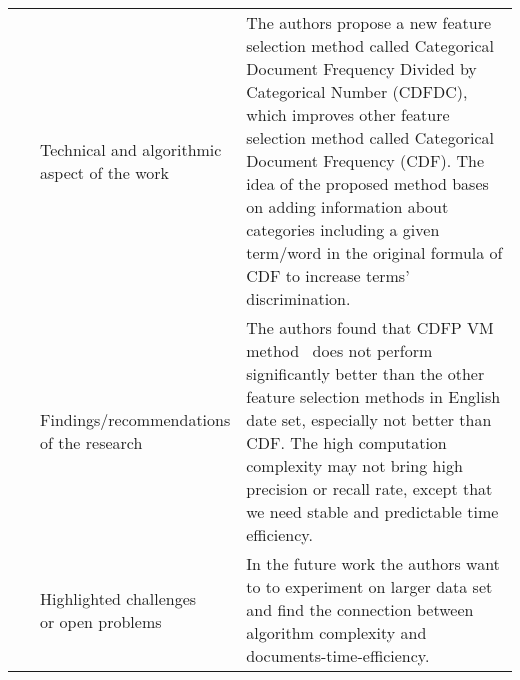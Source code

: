 \begin{landscape}
\begin{longtable}{lp{}p{}}
	\multirow{3}[0]{*}{~\citep{Wang2016}} & 
    \specialcell{Technical and algorithmic \\ aspect of the work} &
	The authors propose a new feature selection method called Categorical Document Frequency Divided by Categorical Number (CDFDC), which improves other feature selection method called Categorical Document Frequency (CDF). The idea of the proposed method bases on adding information about categories including a given term/word in the original formula of CDF to increase terms' discrimination.    
    \\ & 
    \specialcell{Findings/recommendations \\ of the research} & 
	The authors found that CDFP VM method~\citep{Li2014a} does not perform significantly better than the other feature selection methods in English date set, especially not better than CDF. The high computation complexity may not bring high precision or recall rate, except that we need stable and predictable time efficiency.
    \\ & 
    \specialcell{Highlighted challenges \\ or open problems} & 
    In the future work the authors want to  to experiment on larger data set and find the connection between algorithm complexity and documents-time-efficiency.
	\\
	

\end{longtable}
\end{landscape}
